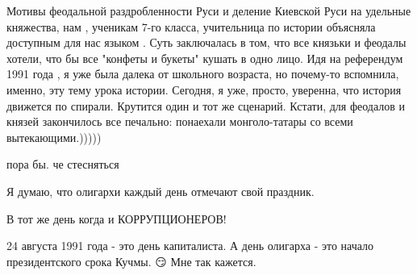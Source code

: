 \begin{itemize}
 

Мотивы феодальной раздробленности Руси и деление Киевской Руси на удельные
княжества, нам , ученикам 7-го класса, учительница по истории объясняла
доступным для нас языком . Суть заключалась в том, что все князьки и феодалы
хотели, что бы все "конфеты и букеты" кушать в одно лицо. Идя на референдум
1991 года , я уже была далека от школьного возраста, но почему-то вспомнила,
именно, эту тему урока истории. Сегодня, я уже, просто, уверенна, что история
движется по спирали. Крутится один и тот же сценарий. Кстати, для феодалов и
князей закончилось все печально: понаехали монголо-татары со всеми
вытекающими.)))))

 
пора бы. че стесняться

 
Я думаю, что олигархи каждый день отмечают свой праздник.

 
В тот же день когда и КОРРУПЦИОНЕРОВ!

 
24 августа 1991 года - это день капиталиста. А день олигарха - это начало президентского срока Кучмы. 😏 Мне так кажется.

 

\end{itemize}
